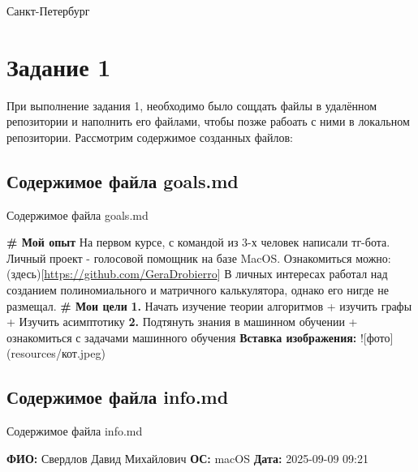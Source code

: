 \documentclass[12pt]{article}
\begin{document}
 

 
  \vspace{\baselineskip}
 \vspace{\baselineskip}
 \vspace{\baselineskip}
 \vspace{\baselineskip}
 \vspace{\baselineskip}
 \usepackage{verbatim}
 \begin{Center}
 Санкт-Петербург \the\year{}
 \end{Center}\par
 \newpage


\section*{Задание 1}
При выполнение задания 1, необходимо было сощдать файлы в удалённом репозитории и наполнить его файлами, чтобы позже рабоать с ними в локальном репозитории. Рассмотрим содержимое созданных файлов:

\subsection{Содержимое файла goals.md}
\begin{algorithm}[H]
\caption{Содержимое файла goals.md}
\begin{algorithmic}[1]
\State \textbf{\# Мой опыт}
\State На первом курсе, с командой из 3-х человек написали тг-бота.
\State Личный проект - голосовой помощник на базе MacOS.
\State Ознакомиться можно: (здесь)[\url{https://github.com/GeraDrobierro}]
\State В личных интересах работал над созданием полиномиального и матричного калькулятора,
\State однако его нигде не размещал.
\State
\State \textbf{\# Мои цели}
\State \textbf{1.} Начать изучение теории алгоритмов
\State \quad + изучить графы
\State \quad + Изучить асимптотику
\State \textbf{2.} Подтянуть знания в машинном обучении
\State \quad + ознакомиться с задачами машинного обучения
\State
\State \textbf{Вставка изображения:} ![фото](resources/кот.jpeg)
\end{algorithmic}
\end{algorithm}

\subsection{Содержимое файла info.md}
\begin{algorithm}[H]
\caption{Содержимое файла info.md}
\begin{algorithmic}[1]
\State \textbf{ФИО:} Свердлов Давид Михайлович
\State \textbf{ОС:} macOS
\State \textbf{Дата:} 2025-09-09 09:21
\end{algorithmic}
\end{algorithm}
\end{document}
